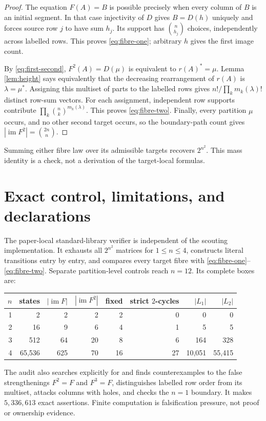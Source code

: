 \documentclass[a4paper,10pt]{amsart}
\theoremstyle{remark}
\newcommand{\im}{\operatorname{im}}
\begin{document}
\begin{proof}
The equation $F(A)=B$ is possible precisely when every column of $B$ is an
initial segment.  In that case injectivity of $D$ gives $B=D(h)$ uniquely and
forces source row $j$ to have sum $h_j$.  Its support has
$\binom n{h_j}$ choices, independently across labelled rows.  This proves
\eqref{eq:fibre-one}; arbitrary $h$ gives the first image count.

By \eqref{eq:first-second}, $F^2(A)=D(\mu)$ is equivalent to
$r(A)^*=\mu$.  Lemma \ref{lem:height} says equivalently that the decreasing
rearrangement of $r(A)$ is $\lambda=\mu^*$.  Assigning this multiset of parts
to the labelled rows gives $n!/\prod_km_k(\lambda)!$ distinct row-sum vectors.
For each assignment, independent row supports contribute
$\prod_k\binom nk^{m_k(\lambda)}$.  This proves \eqref{eq:fibre-two}.
Finally, every partition $\mu$ occurs, and no other second target occurs, so
the boundary-path count gives $|\im F^2|=\binom{2n}{n}$.
\end{proof}

Summing either fibre law over its admissible targets recovers $2^{n^2}$.
This mass identity is a check, not a derivation of the target-local formulas.

\section{Exact control, limitations, and declarations}

The paper-local standard-library verifier is independent of the scouting
implementation.  It exhausts all $2^{n^2}$ matrices for $1\leq n\leq4$,
constructs literal transitions entry by entry, and compares every target
fibre with \eqref{eq:fibre-one}--\eqref{eq:fibre-two}.  Separate
partition-level controls reach $n=12$.  Its complete boxes are:
\begin{center}
\small
\begin{tabular}{rrrrrrrr}
\toprule
$n$ & states & $|\im F|$ & $|\im F^2|$ & fixed & strict $2$-cycles
& $|L_1|$ & $|L_2|$\\
\midrule
1 & 2 & 2 & 2 & 2 & 0 & 0 & 0\\
2 & 16 & 9 & 6 & 4 & 1 & 5 & 5\\
3 & 512 & 64 & 20 & 8 & 6 & 164 & 328\\
4 & 65,536 & 625 & 70 & 16 & 27 & 10,051 & 55,415\\
\bottomrule
\end{tabular}
\end{center}
The audit also searches explicitly for and finds counterexamples to the false
strengthenings $F^2=F$ and $F^3=F$, distinguishes labelled row order from its
multiset, attacks columns with holes, and checks the $n=1$ boundary.  It makes
$5{,}336{,}613$ exact assertions.  Finite computation is falsification
pressure, not proof or ownership evidence.
\end{document}
